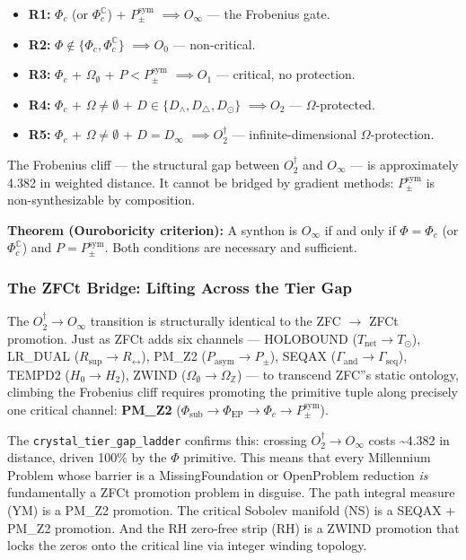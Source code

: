 \documentclass[12pt,a4paper]{article}
\begin{document}
\begin{itemize}
    \item \textbf{R1:} $\Phi_c$ (or $\Phi_c^\mathbb{C}$) + $P_{\pm}^{\text{sym}}$ $\implies O_{\infty}$ --- the Frobenius gate.
    \item \textbf{R2:} $\Phi \notin \{\Phi_c, \Phi_c^\mathbb{C}\}$ $\implies O_0$ --- non-critical.
    \item \textbf{R3:} $\Phi_c$ + $\Omega_{\emptyset}$ + $P < P_{\pm}^{\text{sym}}$ $\implies O_1$ --- critical, no protection.
    \item \textbf{R4:} $\Phi_c$ + $\Omega \neq \emptyset$ + $D \in \{D_{\wedge}, D_{\triangle}, D_{\odot}\}$ $\implies O_2$ --- $\Omega$-protected.
    \item \textbf{R5:} $\Phi_c$ + $\Omega \neq \emptyset$ + $D = D_{\infty}$ $\implies O_2^\dagger$ --- infinite-dimensional $\Omega$-protection.
\end{itemize}

The Frobenius cliff --- the structural gap between $O_2^\dagger$ and $O_{\infty}$ --- is approximately 4.382 in weighted distance. It cannot be bridged by gradient methods: $P_{\pm}^{\text{sym}}$ is non-synthesizable by composition.

\textbf{Theorem (Ouroboricity criterion):} A synthon is $O_{\infty}$ if and only if $\Phi = \Phi_c$ (or $\Phi_c^\mathbb{C}$) and $P = P_{\pm}^{\text{sym}}$. Both conditions are necessary and sufficient.

\subsubsection{The ZFCt Bridge: Lifting Across the Tier Gap}

The $O_2^\dagger \to O_{\infty}$ transition is structurally identical to the ZFC $\to$ ZFCt promotion. Just as ZFCt adds six channels --- HOLOBOUND ($T_{\text{net}} \to T_{\odot}$), LR\_DUAL ($R_{\text{sup}} \to R_{\leftrightarrow}$), PM\_Z2 ($P_{\text{asym}} \to P_{\pm}$), SEQAX ($\Gamma_{\text{and}} \to \Gamma_{\text{seq}}$), TEMPD2 ($H_0 \to H_2$), ZWIND ($\Omega_{\emptyset} \to \Omega_\mathbb{Z}$) --- to transcend ZFC''s static ontology, climbing the Frobenius cliff requires promoting the primitive tuple along precisely one critical channel: \textbf{PM\_Z2} ($\Phi_{\text{sub}} \to \Phi_{\text{EP}} \to \Phi_c \to P_{\pm}^{\text{sym}}$).

The \texttt{crystal\_tier\_gap\_ladder} confirms this: crossing $O_2^\dagger \to O_{\infty}$ costs \textasciitilde{}4.382 in distance, driven 100\% by the $\Phi$ primitive. This means that every Millennium Problem whose barrier is a MissingFoundation or OpenProblem reduction \emph{is} fundamentally a ZFCt promotion problem in disguise. The path integral measure (YM) is a PM\_Z2 promotion. The critical Sobolev manifold (NS) is a SEQAX + PM\_Z2 promotion. And the RH zero-free strip (RH) is a ZWIND promotion that locks the zeros onto the critical line via integer winding topology.
\end{document}
